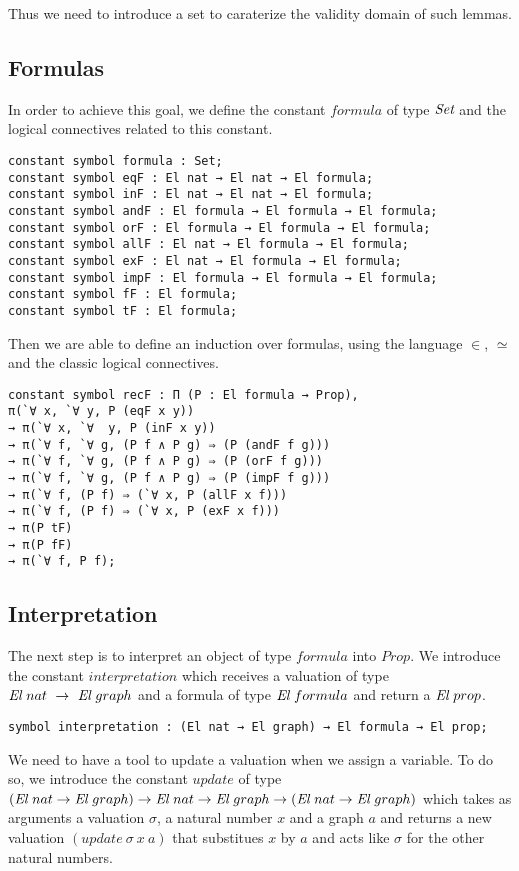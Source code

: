 \documentclass[a4paper]{article}
\begin{document}
Thus we need to introduce a set to caraterize the validity domain of such lemmas.

\subsection{Formulas}

In order to achieve this goal, we define the constant $formula$ of type $\mbox{\it Set}$ and the logical connectives related to this constant.

\begin{lstlisting}
constant symbol formula : Set;
constant symbol eqF : El nat → El nat → El formula;
constant symbol inF : El nat → El nat → El formula;
constant symbol andF : El formula → El formula → El formula;
constant symbol orF : El formula → El formula → El formula;
constant symbol allF : El nat → El formula → El formula;
constant symbol exF : El nat → El formula → El formula;
constant symbol impF : El formula → El formula → El formula;
constant symbol fF : El formula;
constant symbol tF : El formula;
\end{lstlisting}

Then we are able to define an induction over formulas, using the language $\in$, $\simeq$ and the classic logical connectives.

\begin{lstlisting}
constant symbol recF : Π (P : El formula → Prop), 
π(`∀ x, `∀ y, P (eqF x y))
→ π(`∀ x, `∀  y, P (inF x y))
→ π(`∀ f, `∀ g, (P f ∧ P g) ⇒ (P (andF f g)))
→ π(`∀ f, `∀ g, (P f ∧ P g) ⇒ (P (orF f g)))
→ π(`∀ f, `∀ g, (P f ∧ P g) ⇒ (P (impF f g)))
→ π(`∀ f, (P f) ⇒ (`∀ x, P (allF x f)))
→ π(`∀ f, (P f) ⇒ (`∀ x, P (exF x f)))
→ π(P tF)
→ π(P fF)
→ π(`∀ f, P f);
\end{lstlisting}

\subsection{Interpretation}

The next step is to interpret an object of type $formula$ into $Prop$. We introduce the constant $interpretation$ which receives a valuation of type ${\mbox{\it El}} \ nat \ \rightarrow \ {\mbox{\it El}}~graph$ and a formula of type ${\mbox{\it El}} \ formula$ and return a ${\mbox{\it El}}~prop$.

\begin{lstlisting}
symbol interpretation : (El nat → El graph) → El formula → El prop;
\end{lstlisting} 

We need to have a tool to update a valuation when we assign a variable. To do so, we introduce the constant $update$ of type $(\El \ nat \ra \El~graph) \ra \El \ nat \ra \El~graph \ra (\El \ nat \ra \El~graph)$ which takes as arguments a valuation $\sigma$, a natural number $x$ and a graph $a$ and returns a new valuation $(update \ \sigma \ x \ a)$ that substitues $x$ by $a$ and acts like $\sigma$ for the other natural numbers.
\end{document}
